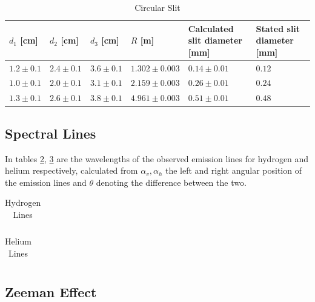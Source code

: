 \documentclass[11pt,a4paper]{article}
\begin{document}
    \begin{table}[H]
        \center
        \caption{Circular Slit}
         \begin{tabular}{l l l l l l}
            $d_1$ [cm] & $d_2$ [cm] & $d_3$ [cm] & $R$ [m] & Calculated slit diameter [mm] & Stated slit diameter [mm] \\ \hline
            $1.2 \pm 0.1$ & $2.4 \pm 0.1$ & $3.6 \pm 0.1$ & $1.302 \pm  0.003$ & $0.14 \pm 0.01$ & $0.12$ \\ 
            $1.0 \pm 0.1$ & $2.0 \pm 0.1$ & $3.1 \pm 0.1$ & $2.159 \pm  0.003$ & $0.26 \pm 0.01$ & $0.24$ \\ 
            $1.3 \pm 0.1$ & $2.6 \pm 0.1$ & $3.8 \pm 0.1$ & $4.961 \pm  0.003$ & $0.51 \pm 0.01$ & $0.48$ \\ 
         \end{tabular}
         \label{tab:circslit}
    \end{table}


    \subsection{\label{subsect:spectral}Spectral Lines}

    In tables \ref{tab:hydrogen}, \ref{tab:helium} are the wavelengths of the observed emission lines for hydrogen and helium respectively, calculated from $\alpha_v, \alpha_h$ the left and right angular position of the emission lines and $\theta$ denoting the difference between the two.
    
    \begin{table}[H]
        \center
        \caption{Hydrogen Lines}
        \begin{tabular}{ l l l l}
        
        \end{tabular}
        \label{tab:hydrogen}
    \end{table}

    \begin{table}[H]
        \center
        \caption{Helium Lines}
        \begin{tabular}{ l l l l}
            
        \end{tabular}
        \label{tab:helium}
    \end{table}

    \subsection{\label{subsect:res_Zeeman}Zeeman Effect}
\end{document}
